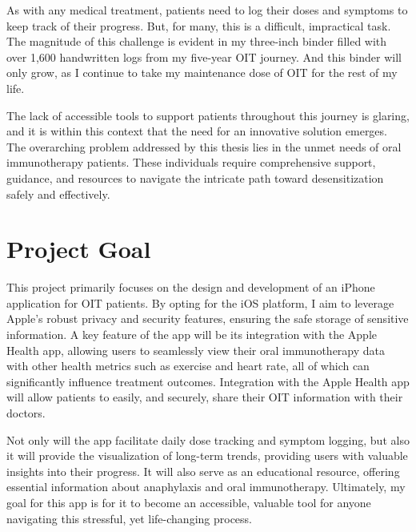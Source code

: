 As with any medical treatment, patients need to log their doses and symptoms to keep track of their progress. But, for many, this is a difficult, impractical task. The magnitude of this challenge is evident in my three-inch binder filled with over 1,600 handwritten logs from my five-year OIT journey. And this binder will only grow, as I continue to take my maintenance dose of OIT for the rest of my life.

The lack of accessible tools to support patients throughout this journey is glaring, and it is within this context that the need for an innovative solution emerges. The overarching problem addressed by this thesis lies in the unmet needs of oral immunotherapy patients. These individuals require comprehensive support, guidance, and resources to navigate the intricate path toward desensitization safely and effectively. 

\section{Project Goal}

This project primarily focuses on the design and development of an iPhone application for OIT patients. By opting for the iOS platform, I aim to leverage Apple's robust privacy and security features, ensuring the safe storage of sensitive information. A key feature of the app will be its integration with the Apple Health app, allowing users to seamlessly view their oral immunotherapy data with other health metrics such as exercise and heart rate, all of which can significantly influence treatment outcomes. Integration with the Apple Health app will allow patients to easily, and securely, share their OIT information with their doctors.

Not only will the app facilitate daily dose tracking and symptom logging, but also it will provide the visualization of long-term trends, providing users with valuable insights into their progress. It will also serve as an educational resource, offering essential information about anaphylaxis and oral immunotherapy. Ultimately, my goal for this app is for it to become an accessible, valuable tool for anyone navigating this stressful, yet life-changing process.


